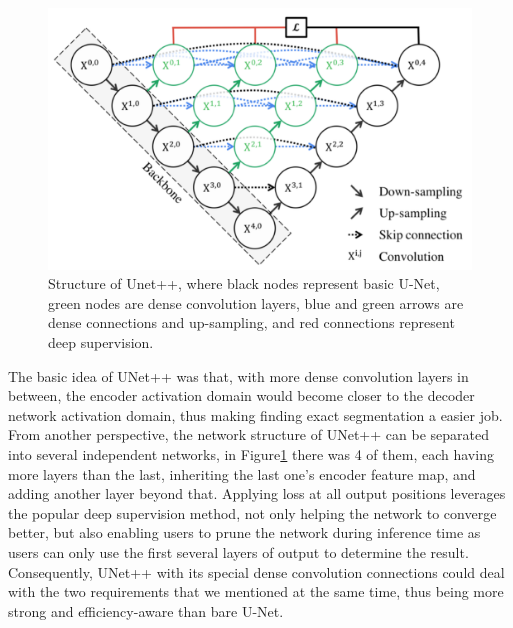 \begin{figure}[!htpb]
\centering
\includegraphics[scale=0.3]{figuras/unetStructure.png}
\caption{Structure of Unet++, where black nodes represent basic U-Net, green nodes are dense convolution layers, blue and green arrows are dense connections and up-sampling, and red connections represent deep supervision.}
\label{fig:unetStructure}
\end{figure}

The basic idea of UNet++ was that, with more dense convolution layers in between, the encoder activation domain would become closer to the decoder network activation domain, thus making finding exact segmentation a easier job. From another perspective, the network structure of UNet++ can be separated into several independent networks, in Figure\ref{fig:unetStructure} there was 4 of them, each having more layers than the last, inheriting the last one's encoder feature map, and adding another layer beyond that. Applying loss at all output positions leverages the popular deep supervision method, not only helping the network to converge better, but also enabling users to prune the network during inference time as users can only use the first several layers of output to determine the result. Consequently, UNet++ with its special dense convolution connections could deal with the two requirements that we mentioned at the same time, thus being more strong and efficiency-aware than bare U-Net.
